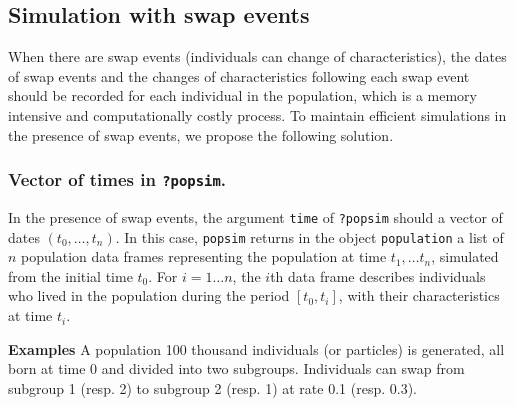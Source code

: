 \hypertarget{simulationswap}{%
\subsection{Simulation with swap events}\label{simulationswap}}

When there are swap events (individuals can change of characteristics), the dates of swap events and the changes of characteristics following each swap event should be recorded for each individual in the population, which is a memory intensive and computationally costly process.
To maintain efficient simulations in the presence of swap events, we propose the following solution.

\hypertarget{vector-of-times-in-popsim.}{%
\subsubsection{\texorpdfstring{Vector of times in \texttt{?popsim}.}{Vector of times in ?popsim.}}\label{vector-of-times-in-popsim.}}

In the presence of swap events, the argument \texttt{time} of \texttt{?popsim} should a vector of dates \((t_0,\dots, t_n)\). In this case, \texttt{popsim} returns in the object \texttt{population} a list of \(n\) population data frames representing the population at time \(t_1,\dots t_n\), simulated from the initial time \(t_0\).
For \(i=1\dots n\), the \(i\)th data frame describes individuals who lived in the population during the period \([t_0,t_i]\), with their characteristics at time \(t_i\).

\textbf{Examples} A population 100 thousand individuals (or particles) is generated, all born at time 0 and divided into two subgroups. Individuals can swap from subgroup 1 (resp. 2) to subgroup 2 (resp. 1) at rate 0.1 (resp. 0.3).

